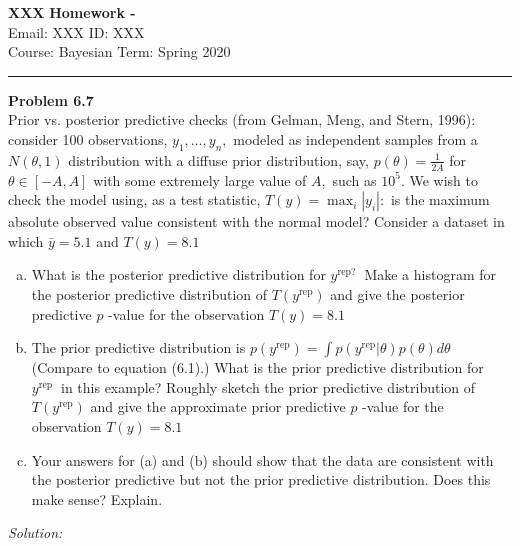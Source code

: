 \documentclass[a4paper, 11pt]{article}
\newenvironment{problem}[2][Problem]
    { \begin{mdframed}[backgroundcolor=gray!20] \textbf{#1 #2} \\}
    {  \end{mdframed}}
\newenvironment{solution}
    {\textit{Solution:}}
    {}
\begin{document}
\noindent
\large\textbf{XXX} \hfill \textbf{Homework - }   \\
Email: XXX \hfill ID: XXX \\
\normalsize Course: Bayesian \hfill Term: Spring 2020\\
\noindent\rule{7in}{2.8pt}



\begin{problem}{6.7}
    Prior vs. posterior predictive checks (from Gelman, Meng, and Stern, 1996): consider 100 observations, $y_{1}, \ldots, y_{n},$ modeled as independent samples from a $N(\theta, 1)$ distribution with a diffuse prior distribution, say, $p(\theta)=\frac{1}{2 A}$ for $\theta \in[-A, A]$ with some extremely large value of $A,$ such as $10^{5} .$ We wish to check the model using, as a test statistic, $T(y)=\max _{i}\left|y_{i}\right|:$ is the maximum absolute observed value consistent with the normal model? Consider a dataset in which $\bar{y}=5.1$ and $T(y)=8.1$
    \begin{enumerate}[(a)]
        \item What is the posterior predictive distribution for $y^{\text {rep? }}$ Make a histogram for the posterior predictive distribution of $T\left(y^{\mathrm{rep}}\right)$ and give the posterior predictive $p$ -value for the observation $T(y)=8.1$
        \item The prior predictive distribution is $p\left(y^{\mathrm{rep}}\right)=\int p\left(y^{\mathrm{rep}} | \theta\right) p(\theta) d \theta$ (Compare to equation 
        (6.1).) What is the prior predictive distribution for $y^{\text {rep }}$ in this example? Roughly sketch the prior predictive distribution of $T\left(y^{\mathrm{rep}}\right)$ and give the approximate prior predictive $p$ -value for the observation $T(y)=8.1$
        \item Your answers for (a) and (b) should show that the data are consistent with the posterior predictive but not the prior predictive distribution. Does this make sense? Explain.
    \end{enumerate}
\end{problem}
\begin{solution}

\end{solution}
\end{document}
